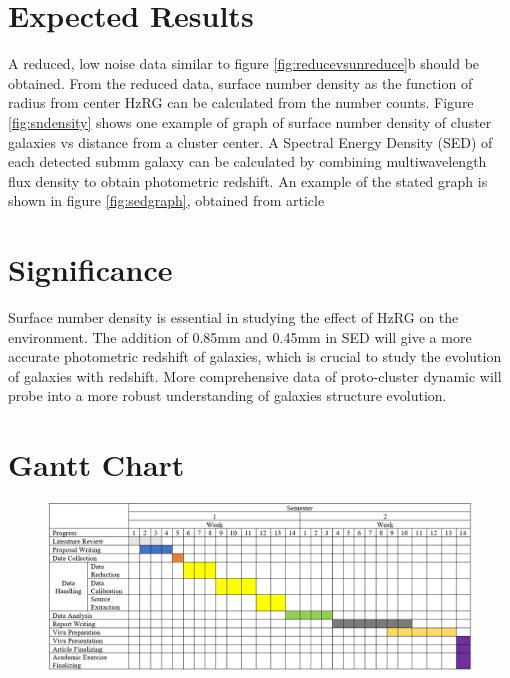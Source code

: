 \documentclass{article}
\begin{document}
\section{Expected Results}
A reduced, low noise data similar to figure \ref{fig:reducevsunreduce}b should be obtained. From the reduced data, surface number density as the function of radius from center HzRG can be calculated from the number counts. Figure \ref{fig:sndensity} shows one example of graph of surface number density of cluster galaxies vs distance from a cluster center. A Spectral Energy Density (SED) of each detected submm galaxy can be calculated by combining multiwavelength flux density to obtain photometric redshift. An example of the stated graph is shown in figure \ref{fig:sedgraph}, obtained from article \cite{Zotti2018}

\section{Significance}
Surface number density is essential in studying the effect of HzRG on the environment. The addition of 0.85mm and 0.45mm in SED will give a more accurate photometric redshift of galaxies, which is crucial to study the evolution of galaxies with redshift. More comprehensive data of proto-cluster dynamic will probe into a more robust understanding of galaxies structure evolution.

\section{Gantt Chart}
\begin{figure}[h]
    \centering
    \includegraphics[width=150mm]{gantt chart.png}
    \caption{}
    \label{fig:ganttchart}
\end{figure}



\end{document}
